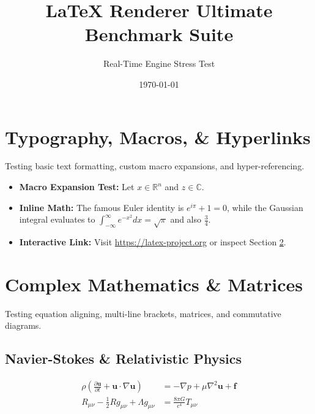 \documentclass[12pt, a4paper]{article}
\title{\textbf{LaTeX Renderer Ultimate Benchmark Suite}}
\author{Real-Time Engine Stress Test}
\date{\today}
\newcommand{\R}{\mathbb{R}}
\newcommand{\C}{\mathbb{C}}
\begin{document}
\maketitle
\tableofcontents
\newpage

\section{Typography, Macros, \& Hyperlinks}
Testing basic text formatting, custom macro expansions, and hyper-referencing.

\begin{itemize}
  \item \textbf{Macro Expansion Test:} Let $x \in \R^n$ and $z \in \C$.
  \item \textbf{Inline Math:} The famous Euler identity is $e^{i\pi} + 1 = 0$, while the Gaussian integral evaluates to $\int_{-\infty}^{\infty} e^{-x^2} dx = \sqrt{\pi}$ and also $\frac{3}{4}$.
  \item \textbf{Interactive Link:} Visit \url{https://latex-project.org} or inspect Section \ref{sec:math}.
\end{itemize}

\section{Complex Mathematics \& Matrices}\label{sec:math}
Testing equation aligning, multi-line brackets, matrices, and commutative diagrams.

\subsection{Navier-Stokes \& Relativistic Physics}
\begin{align}
    \rho \left( \frac{\partial \mathbf{u}}{\partial t} + \mathbf{u} \cdot \nabla \mathbf{u} \right) &= -\nabla p + \mu \nabla^2 \mathbf{u} + \mathbf{f} \label{eq:navier} \\
    R_{\mu\nu} - \frac{1}{2}R g_{\mu\nu} + \Lambda g_{\mu\nu} &= \frac{8\pi G}{c^4} T_{\mu\nu}
\end{align}
\end{document}
